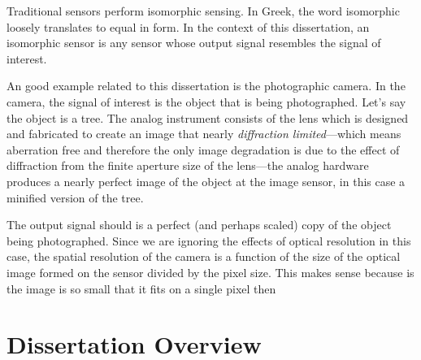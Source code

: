 Traditional sensors perform isomorphic sensing. In Greek, the word isomorphic loosely translates to equal in form. In the context of this dissertation, an isomorphic sensor is any sensor whose output signal resembles the signal of interest. 

An good example related to this dissertation is the photographic camera. In the camera, the signal of interest is the object that is being photographed. Let's say the object is a tree. The analog instrument consists of the lens which is designed and fabricated to create an image that nearly \emph{diffraction limited}---which means aberration free and therefore the only image degradation is due to the effect of diffraction from the finite aperture size of the lens---the analog hardware produces a nearly perfect image of the object at the image sensor, in this case a minified version of the tree.



The output signal should is a perfect (and perhaps scaled) copy of the object being photographed. Since we are ignoring the effects of optical resolution in this case, the spatial resolution of the camera is a function of the size of the optical image formed on the sensor divided by the pixel size. This makes sense because is the image is so small that it fits on a single pixel then

\section{Dissertation Overview}





%  
%

